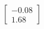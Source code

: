 \documentclass[preview]{standalone}
\begin{document}
\begin{align*}
\begin{bmatrix} -0.08 \\ 1.68 \end{bmatrix}
\end{align*}
\end{document}
